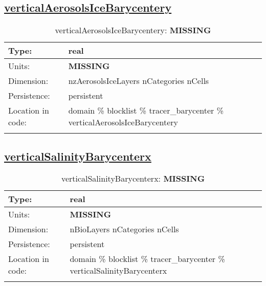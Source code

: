 \subsection[verticalAerosolsIceBarycentery]{\hyperref[sec:var_tab_tracer_barycenter]{verticalAerosolsIceBarycentery}}
\label{subsec:var_sec_tracer_barycenter_verticalAerosolsIceBarycentery}
\begin{center}
\begin{longtable}{| p{2.0in} | p{4.0in} |}
        \hline 
        Type: & real \\
        \hline 
        Units: & {\bf \color{red} MISSING} \\
        \hline 
        Dimension: & nzAerosolsIceLayers nCategories nCells \\
        \hline 
        Persistence: & persistent \\
        \hline 
         Location in code: & domain \% blocklist \% tracer\_barycenter \% verticalAerosolsIceBarycentery \\
         \hline 
    \caption{verticalAerosolsIceBarycentery: {\bf \color{red} MISSING}}
\end{longtable}
\end{center}
\subsection[verticalSalinityBarycenterx]{\hyperref[sec:var_tab_tracer_barycenter]{verticalSalinityBarycenterx}}
\label{subsec:var_sec_tracer_barycenter_verticalSalinityBarycenterx}
\begin{center}
\begin{longtable}{| p{2.0in} | p{4.0in} |}
        \hline 
        Type: & real \\
        \hline 
        Units: & {\bf \color{red} MISSING} \\
        \hline 
        Dimension: & nBioLayers nCategories nCells \\
        \hline 
        Persistence: & persistent \\
        \hline 
         Location in code: & domain \% blocklist \% tracer\_barycenter \% verticalSalinityBarycenterx \\
         \hline 
    \caption{verticalSalinityBarycenterx: {\bf \color{red} MISSING}}
\end{longtable}
\end{center}
